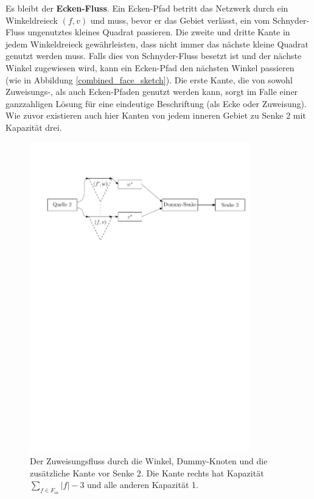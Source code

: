 Es bleibt der \textbf{Ecken-Fluss}. Ein Ecken-Pfad betritt das Netzwerk durch ein Winkeldreieck $(f,v)$ und muss, bevor er das Gebiet verlässt, ein vom Schnyder-Fluss ungenutztes kleines Quadrat passieren. Die zweite und dritte Kante in jedem Winkeldreieck gewährleisten, dass nicht immer das nächste kleine Quadrat genutzt werden muss. Falls dies von Schnyder-Fluss besetzt ist und der nächste Winkel zugewiesen wird, kann ein Ecken-Pfad den nächsten Winkel passieren (wie in Abbildung \ref{combined_face_sketch}). Die erste Kante, die von sowohl Zuweisungs-, als auch Ecken-Pfaden genutzt werden kann, sorgt im Falle einer ganzzahligen Lösung für eine eindeutige Beschriftung (als Ecke oder Zuweisung). Wie zuvor existieren auch hier Kanten von jedem inneren Gebiet zu Senke 2 mit Kapazität drei.

\begin{figure}
	\centering
  	\includegraphics[width=0.85\textwidth]{dummy_sink.pdf}
  	\caption{Der Zuweisungsfluss durch die Winkel, Dummy-Knoten und die zusätzliche Kante vor Senke 2. Die Kante rechts hat Kapazität $\sum_{f \in F_{in}} |f|-3$ und alle anderen Kapazität 1.}
	\label{dummy_sink}
\end{figure}

